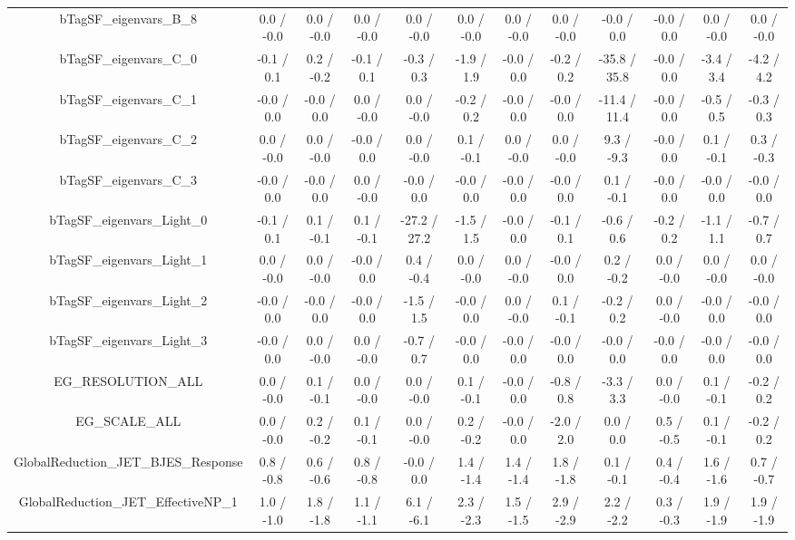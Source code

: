 \begin{table}[htbp]
\begin{center}
\begin{tabular}{|c|c|c|c|c|c|c|c|c|c|c|c|}
  bTagSF_eigenvars_B_8 & 0.0 / -0.0 & 0.0 / -0.0 & 0.0 / -0.0 & 0.0 / -0.0 & 0.0 / -0.0 & 0.0 / -0.0 & 0.0 / -0.0 & -0.0 / 0.0 & -0.0 / 0.0 & 0.0 / -0.0 & 0.0 / -0.0 \\ 
  bTagSF_eigenvars_C_0 & -0.1 / 0.1 & 0.2 / -0.2 & -0.1 / 0.1 & -0.3 / 0.3 & -1.9 / 1.9 & -0.0 / 0.0 & -0.2 / 0.2 & -35.8 / 35.8 & -0.0 / 0.0 & -3.4 / 3.4 & -4.2 / 4.2 \\ 
  bTagSF_eigenvars_C_1 & -0.0 / 0.0 & -0.0 / 0.0 & 0.0 / -0.0 & 0.0 / -0.0 & -0.2 / 0.2 & -0.0 / 0.0 & -0.0 / 0.0 & -11.4 / 11.4 & -0.0 / 0.0 & -0.5 / 0.5 & -0.3 / 0.3 \\ 
  bTagSF_eigenvars_C_2 & 0.0 / -0.0 & 0.0 / -0.0 & -0.0 / 0.0 & 0.0 / -0.0 & 0.1 / -0.1 & 0.0 / -0.0 & 0.0 / -0.0 & 9.3 / -9.3 & -0.0 / 0.0 & 0.1 / -0.1 & 0.3 / -0.3 \\ 
  bTagSF_eigenvars_C_3 & -0.0 / 0.0 & -0.0 / 0.0 & 0.0 / -0.0 & -0.0 / 0.0 & -0.0 / 0.0 & -0.0 / 0.0 & -0.0 / 0.0 & 0.1 / -0.1 & -0.0 / 0.0 & -0.0 / 0.0 & -0.0 / 0.0 \\ 
  bTagSF_eigenvars_Light_0 & -0.1 / 0.1 & 0.1 / -0.1 & 0.1 / -0.1 & -27.2 / 27.2 & -1.5 / 1.5 & -0.0 / 0.0 & -0.1 / 0.1 & -0.6 / 0.6 & -0.2 / 0.2 & -1.1 / 1.1 & -0.7 / 0.7 \\ 
  bTagSF_eigenvars_Light_1 & 0.0 / -0.0 & 0.0 / -0.0 & -0.0 / 0.0 & 0.4 / -0.4 & 0.0 / -0.0 & 0.0 / -0.0 & -0.0 / 0.0 & 0.2 / -0.2 & 0.0 / -0.0 & 0.0 / -0.0 & 0.0 / -0.0 \\ 
  bTagSF_eigenvars_Light_2 & -0.0 / 0.0 & -0.0 / 0.0 & -0.0 / 0.0 & -1.5 / 1.5 & -0.0 / 0.0 & 0.0 / -0.0 & 0.1 / -0.1 & -0.2 / 0.2 & 0.0 / -0.0 & -0.0 / 0.0 & -0.0 / 0.0 \\ 
  bTagSF_eigenvars_Light_3 & -0.0 / 0.0 & 0.0 / -0.0 & 0.0 / -0.0 & -0.7 / 0.7 & -0.0 / 0.0 & -0.0 / 0.0 & -0.0 / 0.0 & -0.0 / 0.0 & -0.0 / 0.0 & -0.0 / 0.0 & -0.0 / 0.0 \\ 
  EG_RESOLUTION_ALL & 0.0 / -0.0 & 0.1 / -0.1 & 0.0 / -0.0 & 0.0 / -0.0 & 0.1 / -0.1 & -0.0 / 0.0 & -0.8 / 0.8 & -3.3 / 3.3 & 0.0 / -0.0 & 0.1 / -0.1 & -0.2 / 0.2 \\ 
  EG_SCALE_ALL & 0.0 / -0.0 & 0.2 / -0.2 & 0.1 / -0.1 & 0.0 / -0.0 & 0.2 / -0.2 & -0.0 / 0.0 & -2.0 / 2.0 & 0.0 / 0.0 & 0.5 / -0.5 & 0.1 / -0.1 & -0.2 / 0.2 \\ 
  GlobalReduction_JET_BJES_Response & 0.8 / -0.8 & 0.6 / -0.6 & 0.8 / -0.8 & -0.0 / 0.0 & 1.4 / -1.4 & 1.4 / -1.4 & 1.8 / -1.8 & 0.1 / -0.1 & 0.4 / -0.4 & 1.6 / -1.6 & 0.7 / -0.7 \\ 
  GlobalReduction_JET_EffectiveNP_1 & 1.0 / -1.0 & 1.8 / -1.8 & 1.1 / -1.1 & 6.1 / -6.1 & 2.3 / -2.3 & 1.5 / -1.5 & 2.9 / -2.9 & 2.2 / -2.2 & 0.3 / -0.3 & 1.9 / -1.9 & 1.9 / -1.9 \\ 

\end{tabular}
\end{center}
\end{table}
